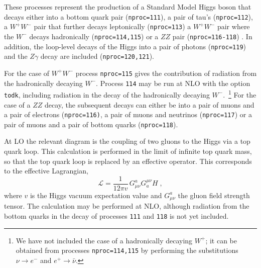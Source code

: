 \label{subsec:h}

These processes represent the production of a Standard Model Higgs
boson that decays either into a bottom quark
pair ({\tt nproc=111}), a pair of tau's ({\tt nproc=112}), 
a $W^+W^-$ 
pair that further decays leptonically ({\tt nproc=113}) 
a $W^+W^-$ pair where the $W^-$ decays hadronically ({\tt nproc=114,115}) 
or a $ZZ$ pair ({\tt nproc=116-118}) . In addition, the loop-level decays of the Higgs 
into a pair of photons ({\tt nproc=119}) and the $Z\gamma$ decay are included
({\tt nproc=120,121}).

For the case of $W^+W^-$ process {\tt nproc=115} gives the contribution 
of radiation from the hadronically decaying $W^-$.
Process {\tt 114} may be run at NLO with the option {\tt todk},
including radiation in the decay of the hadronically decaying $W^-$.~\footnote{
We have not included the case of a hadronically decaying $W^+$; it can
be obtained from processes {\tt nproc=114,115} by performing the
substitutions $\nu \to e^-$ and $e^+ \to \bar{\nu}$.}
For the case of a $ZZ$ decay,
the subsequent decays can either be into a pair of muons and a pair of electrons
({\tt nproc=116)}, a pair of muons and neutrinos ({\tt nproc=117}) or
a pair of muons and a pair of bottom quarks ({\tt nproc=118}).

At LO the relevant diagram
is the coupling of two gluons to the Higgs via a top quark loop.
This calculation is performed in the limit of infinite top quark mass, so that 
the top quark loop is replaced by an effective operator. This corresponds
to the effective Lagrangian,
\begin{equation}
\mathcal{L} = \frac{1}{12\pi v} \, G^a_{\mu\nu} G^{\mu\nu}_a H \;,
\label{eq:HeffL}
\end{equation}
where $v$ is the Higgs vacuum expectation value and $G^a_{\mu\nu}$ the
gluon field strength tensor.
The calculation may be performed at NLO, although radiation from the
bottom quarks in the decay of processes {\tt 111} and {\tt 118} is not yet included.


